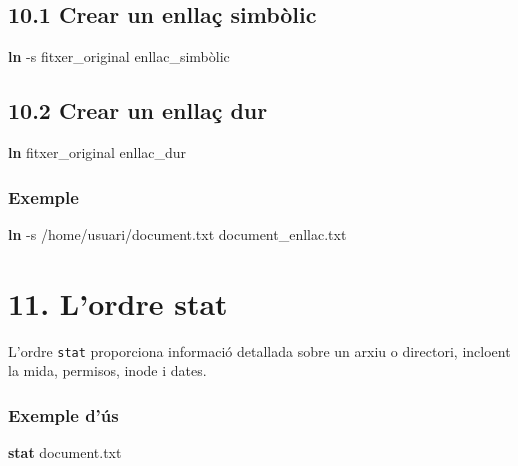 \documentclass[
  12 pt,
  a4paper,
]{article}
\newenvironment{Shaded}{\begin{snugshade}}{\end{snugshade}}
\newcommand{\AttributeTok}[1]{\textcolor[rgb]{0.13,0.29,0.53}{#1}}
\newcommand{\FunctionTok}[1]{\textcolor[rgb]{0.13,0.29,0.53}{\textbf{#1}}}
\newcommand{\NormalTok}[1]{#1}
\begin{document}
\subsection{10.1 Crear un enllaç
simbòlic}\label{crear-un-enllauxe7-simbuxf2lic}

\begin{Shaded}
\begin{Highlighting}[]
\FunctionTok{ln} \AttributeTok{{-}s}\NormalTok{ fitxer\_original enllac\_simbòlic}
\end{Highlighting}
\end{Shaded}

\subsection{10.2 Crear un enllaç dur}\label{crear-un-enllauxe7-dur}

\begin{Shaded}
\begin{Highlighting}[]
\FunctionTok{ln}\NormalTok{ fitxer\_original enllac\_dur}
\end{Highlighting}
\end{Shaded}

\subsubsection{Exemple}\label{exemple-4}

\begin{Shaded}
\begin{Highlighting}[]
\FunctionTok{ln} \AttributeTok{{-}s}\NormalTok{ /home/usuari/document.txt document\_enllac.txt}
\end{Highlighting}
\end{Shaded}

\section{11. L'ordre stat}\label{lordre-stat}

L'ordre \texttt{stat} proporciona informació detallada sobre un arxiu o
directori, incloent la mida, permisos, inode i dates.

\subsubsection{Exemple d'ús}\label{exemple-duxfas-2}

\begin{Shaded}
\begin{Highlighting}[]
\FunctionTok{stat}\NormalTok{ document.txt}
\end{Highlighting}
\end{Shaded}
\end{document}
